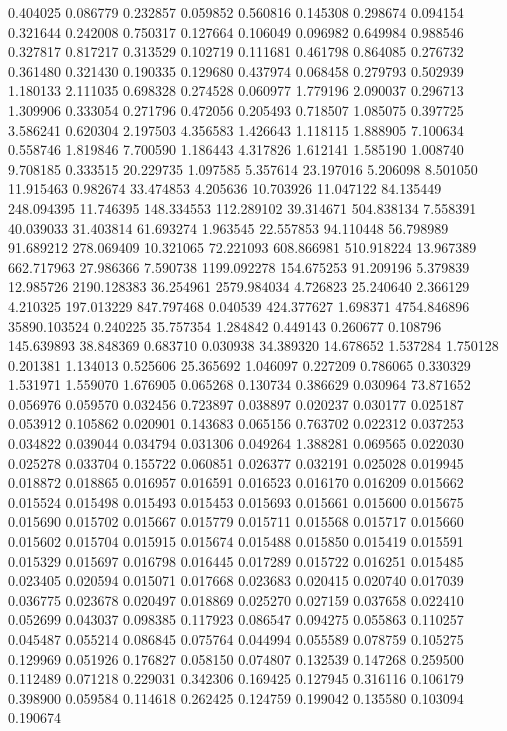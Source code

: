 0.404025
0.086779
0.232857
0.059852
0.560816
0.145308
0.298674
0.094154
0.321644
0.242008
0.750317
0.127664
0.106049
0.096982
0.649984
0.988546
0.327817
0.817217
0.313529
0.102719
0.111681
0.461798
0.864085
0.276732
0.361480
0.321430
0.190335
0.129680
0.437974
0.068458
0.279793
0.502939
1.180133
2.111035
0.698328
0.274528
0.060977
1.779196
2.090037
0.296713
1.309906
0.333054
0.271796
0.472056
0.205493
0.718507
1.085075
0.397725
3.586241
0.620304
2.197503
4.356583
1.426643
1.118115
1.888905
7.100634
0.558746
1.819846
7.700590
1.186443
4.317826
1.612141
1.585190
1.008740
9.708185
0.333515
20.229735
1.097585
5.357614
23.197016
5.206098
8.501050
11.915463
0.982674
33.474853
4.205636
10.703926
11.047122
84.135449
248.094395
11.746395
148.334553
112.289102
39.314671
504.838134
7.558391
40.039033
31.403814
61.693274
1.963545
22.557853
94.110448
56.798989
91.689212
278.069409
10.321065
72.221093
608.866981
510.918224
13.967389
662.717963
27.986366
7.590738
1199.092278
154.675253
91.209196
5.379839
12.985726
2190.128383
36.254961
2579.984034
4.726823
25.240640
2.366129
4.210325
197.013229
847.797468
0.040539
424.377627
1.698371
4754.846896
35890.103524
0.240225
35.757354
1.284842
0.449143
0.260677
0.108796
145.639893
38.848369
0.683710
0.030938
34.389320
14.678652
1.537284
1.750128
0.201381
1.134013
0.525606
25.365692
1.046097
0.227209
0.786065
0.330329
1.531971
1.559070
1.676905
0.065268
0.130734
0.386629
0.030964
73.871652
0.056976
0.059570
0.032456
0.723897
0.038897
0.020237
0.030177
0.025187
0.053912
0.105862
0.020901
0.143683
0.065156
0.763702
0.022312
0.037253
0.034822
0.039044
0.034794
0.031306
0.049264
1.388281
0.069565
0.022030
0.025278
0.033704
0.155722
0.060851
0.026377
0.032191
0.025028
0.019945
0.018872
0.018865
0.016957
0.016591
0.016523
0.016170
0.016209
0.015662
0.015524
0.015498
0.015493
0.015453
0.015693
0.015661
0.015600
0.015675
0.015690
0.015702
0.015667
0.015779
0.015711
0.015568
0.015717
0.015660
0.015602
0.015704
0.015915
0.015674
0.015488
0.015850
0.015419
0.015591
0.015329
0.015697
0.016798
0.016445
0.017289
0.015722
0.016251
0.015485
0.023405
0.020594
0.015071
0.017668
0.023683
0.020415
0.020740
0.017039
0.036775
0.023678
0.020497
0.018869
0.025270
0.027159
0.037658
0.022410
0.052699
0.043037
0.098385
0.117923
0.086547
0.094275
0.055863
0.110257
0.045487
0.055214
0.086845
0.075764
0.044994
0.055589
0.078759
0.105275
0.129969
0.051926
0.176827
0.058150
0.074807
0.132539
0.147268
0.259500
0.112489
0.071218
0.229031
0.342306
0.169425
0.127945
0.316116
0.106179
0.398900
0.059584
0.114618
0.262425
0.124759
0.199042
0.135580
0.103094
0.190674
